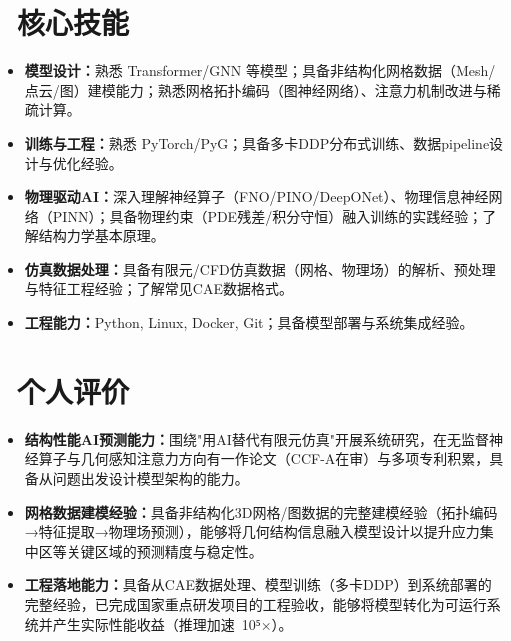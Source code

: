 \documentclass[11pt]{article}
\begin{document}
  
\section{\makebox[\widthof{\faCogs}][c]{\color{CVBlue}\faCogs}\ 核心技能}
    
\begin{itemize}
    \item \textbf{模型设计：}熟悉 Transformer/GNN 等模型；具备非结构化网格数据（Mesh/点云/图）建模能力；熟悉网格拓扑编码（图神经网络）、注意力机制改进与稀疏计算。
    \item \textbf{训练与工程：}熟悉 PyTorch/PyG；具备多卡DDP分布式训练、数据pipeline设计与优化经验。
    \item \textbf{物理驱动AI：}深入理解神经算子（FNO/PINO/DeepONet）、物理信息神经网络（PINN）；具备物理约束（PDE残差/积分守恒）融入训练的实践经验；了解结构力学基本原理。
    \item \textbf{仿真数据处理：}具备有限元/CFD仿真数据（网格、物理场）的解析、预处理与特征工程经验；了解常见CAE数据格式。
    \item \textbf{工程能力：}Python, Linux, Docker, Git；具备模型部署与系统集成经验。
\end{itemize}

\section{\makebox[\widthof{\faUser}][c]{\color{CVBlue}\faUser}\ 个人评价}

\begin{itemize}
    \item \textbf{结构性能AI预测能力：}围绕"用AI替代有限元仿真"开展系统研究，在无监督神经算子与几何感知注意力方向有一作论文（CCF-A在审）与多项专利积累，具备从问题出发设计模型架构的能力。
    \item \textbf{网格数据建模经验：}具备非结构化3D网格/图数据的完整建模经验（拓扑编码→特征提取→物理场预测），能够将几何结构信息融入模型设计以提升应力集中区等关键区域的预测精度与稳定性。
    \item \textbf{工程落地能力：}具备从CAE数据处理、模型训练（多卡DDP）到系统部署的完整经验，已完成国家重点研发项目的工程验收，能够将模型转化为可运行系统并产生实际性能收益（推理加速~10⁵×）。
\end{itemize}
\end{document}
